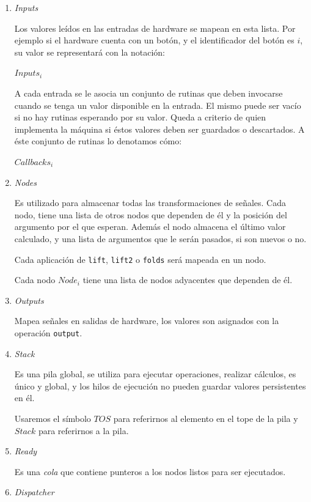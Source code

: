 \begin{enumerate}

\item \emph{Inputs}

  Los valores leídos en las entradas de hardware se mapean
en esta lista. Por ejemplo si el hardware cuenta con un botón,
y el identificador del botón es $i$,
su valor se representará con la notación:

  $Inputs_i$

  A cada entrada se le asocia un conjunto de
rutinas que deben invocarse cuando se tenga un
valor disponible en la entrada. El mismo puede ser vacío si
no hay rutinas esperando por su valor. Queda a criterio de quien
implementa la máquina si éstos valores deben ser guardados o
descartados.
  A éste conjunto de rutinas lo denotamos cómo:

  $Callbacks_i$

\item \emph{Nodes}

  Es utilizado para almacenar todas las transformaciones de señales.
  Cada nodo, tiene una lista de otros nodos que dependen de él y la
  posición del argumento por el que esperan.
  Además el nodo almacena el último valor calculado, y una lista
  de argumentos que le serán pasados, si son nuevos o no.

  Cada aplicación de \texttt{lift}, \texttt{lift2} o \texttt{folds}
será mapeada en un nodo.

  Cada nodo $Node_i$ tiene una lista de nodos adyacentes
que dependen de él.

\item \emph{Outputs}

  Mapea señales en salidas de hardware, los valores
son asignados con la operación \texttt{output}.

\item \emph{Stack}

Es una pila global, se utiliza para ejecutar operaciones,
realizar cálculos, es único
y global, y los hilos de ejecución no pueden guardar valores
persistentes en él.

Usaremos el símbolo $TOS$ para referirnos al elemento en el tope
de la pila y $Stack$ para referirnos a la pila.

\item \emph{Ready}

Es una \emph{cola} que contiene punteros a los nodos
listos para ser ejecutados.

\item \emph{Dispatcher}


\end{enumerate}

